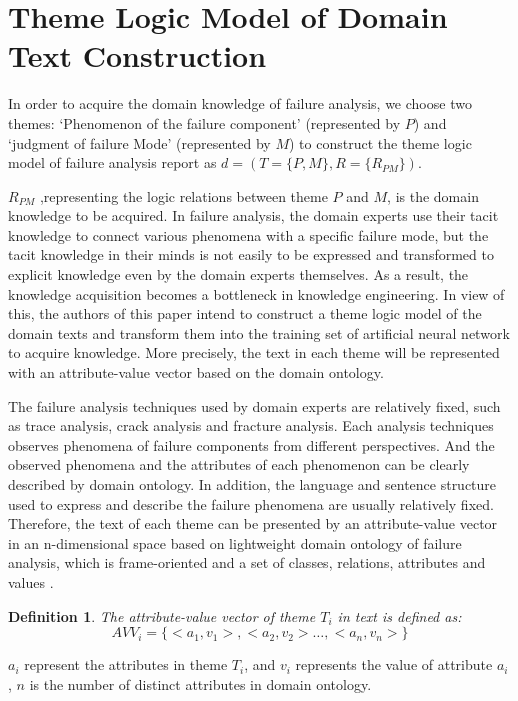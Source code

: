 \documentclass{elsarticle}
\newtheorem{definition}{Definition}
\begin{document}
\section{Theme Logic Model of Domain Text Construction}
\label{sec:theme-logic-model}

In order to acquire the domain knowledge of failure analysis, we
choose two themes: ‘Phenomenon of the failure component’ (represented
by $P$) and ‘judgment of failure Mode’ (represented by $M$) to construct
the theme logic model of failure analysis report as $d = (T = \{P,M\},
R = \{R_{PM}\})$.

$R_{PM}$ ,representing the logic relations between theme $P$ and $M$, is the domain knowledge to be acquired. In failure analysis, the
domain experts use their tacit knowledge to connect various phenomena
with a specific failure mode, but the tacit knowledge in their minds is
not easily to be expressed and transformed to explicit knowledge even
by the domain experts themselves. As a result, the
knowledge acquisition becomes a bottleneck in knowledge
engineering. In view of this, the authors of this paper intend to construct a theme logic model of the domain
texts and transform them into the training set of artificial neural
network to acquire knowledge. More precisely, the text in each
theme will be represented with an attribute-value vector based on the
domain ontology. 

The failure analysis techniques used by domain experts are relatively
fixed, such as trace analysis, crack analysis and fracture
analysis. Each analysis techniques observes phenomena of failure
components from different perspectives. And the observed phenomena and
the attributes of each phenomenon can be clearly described by domain
ontology. In addition, the language and sentence structure used to express and describe the failure phenomena are usually relatively fixed. Therefore, the text of each theme can be presented by an attribute-value vector in an n-dimensional space based on lightweight domain ontology of failure analysis, which is frame-oriented and a set of classes, relations, attributes and values \cite{747902}.

\begin{definition}
  The attribute-value vector of theme $T_i$ in text is defined as:
\[AVV_i = \{<a_1,v_1>,<a_2,v_2> \ldots,<a_n,v_n>\} \]
\end{definition}
$a_i$ represent the attributes in theme $T_i$, and $v_i$ represents the value of attribute $a_i$ , $n$ is the number of distinct attributes in domain ontology.
\end{document}

